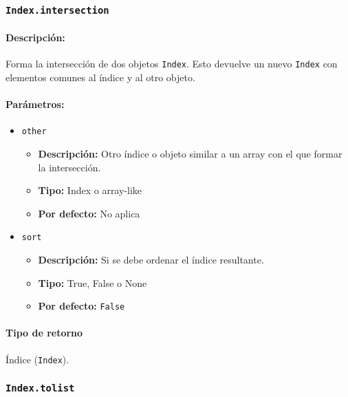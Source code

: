     \subsubsection{\texttt{Index.intersection}}

    \paragraph{Descripción:}
    Forma la intersección de dos objetos \texttt{Index}. Esto devuelve un nuevo \texttt{Index} con elementos comunes al índice y al otro objeto.

    \paragraph{Parámetros:}

    \begin{itemize}
        \item \texttt{other}
            \begin{itemize}
                \item \textbf{Descripción:} Otro índice o objeto similar a un array con el que formar la intersección.
                \item \textbf{Tipo:} Index o array-like
                \item \textbf{Por defecto:} No aplica
            \end{itemize}
        \item \texttt{sort}
            \begin{itemize}
                \item \textbf{Descripción:} Si se debe ordenar el índice resultante.
                \item \textbf{Tipo:} True, False o None
                \item \textbf{Por defecto:} \texttt{False}
            \end{itemize}
    \end{itemize}

    \paragraph{Tipo de retorno}
    Índice (\texttt{Index}).



    \subsubsection{\texttt{Index.tolist}}

